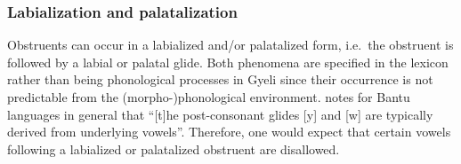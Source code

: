 





\subsubsection{Labialization and palatalization}
\label{sec:Labial}

Obstruents can occur in a labialized and/or palatalized form, i.e.\ the obstruent is followed by a labial or palatal glide. Both phenomena are specified in the lexicon rather than being phonological processes in Gyeli since their occurrence is not predictable from the (morpho-)phonological environment. \citet[55]{hyman2003} notes for Bantu languages in general that ``[t]he post-consonant glides [y] and [w] are typically derived from underlying vowels''. Therefore, one would expect that certain vowels following a labialized or palatalized obstruent are disallowed.
 
